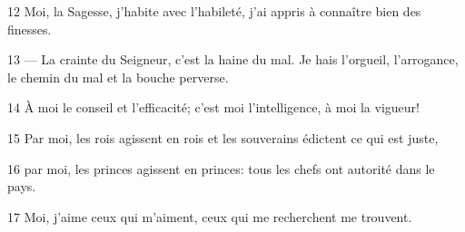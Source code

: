 
12 Moi, la Sagesse, j’habite avec l’habileté, j’ai appris à connaître bien des finesses.

13 --- La crainte du Seigneur, c’est la haine du mal. Je hais l’orgueil, l’arrogance, le chemin du mal et la bouche perverse.

14 À moi le conseil et l’efficacité; c’est moi l’intelligence, à moi la vigueur!

15 Par moi, les rois agissent en rois et les souverains édictent ce qui est juste,

16 par moi, les princes agissent en princes: tous les chefs ont autorité dans le pays.

17 Moi, j’aime ceux qui m’aiment, ceux qui me recherchent me trouvent.